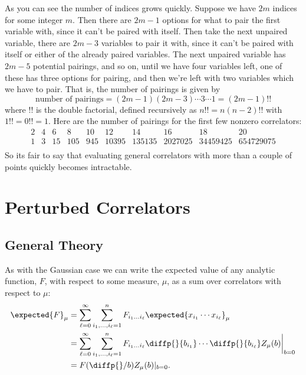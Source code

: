 \documentclass[fleqn]{NotesClass}
\begin{document}
    As you can see the number of indices grows quickly.
    Suppose we have \(2m\) indices for some integer \(m\).
    Then there are \(2m - 1\) options for what to pair the first variable with, since it can't be paired with itself.
    Then take the next unpaired variable, there are \(2m - 3\) variables to pair it with, since it can't be paired with itself or either of the already paired variables.
    The next unpaired variable has \(2m - 5\) potential pairings, and so on, until we have four variables left, one of these has three options for pairing, and then we're left with two variables which we have to pair.
    That is, the number of pairings is given by
    \begin{equation}
        \text{number of pairings} = (2m - 1)(2m - 3) \dotsm 3 \dotsm 1 = (2m - 1)!!
    \end{equation}
    where \(!!\) is the double factorial, defined recursively as \(n!! = n(n - 2)!!\) with \(1!! = 0!! = 1\).
    Here are the number of pairings for the first few nonzero correlators:
    \begin{equation*}
        \begin{array}{rrrrrrrrrr}
            2 & 4 & 6  & 8   & 10  & 12    & 14     & 16      & 18       & 20\\
            1 & 3 & 15 & 105 & 945 & \num{10395} & \num{135135} & \num{2027025} & \num{34459425} & \num{654729075}\\
        \end{array}
    \end{equation*}
    So its fair to say that evaluating general correlators with more than a couple of points quickly becomes intractable.

    \chapter{Perturbed Correlators}
    \section{General Theory}
    As with the Gaussian case we can write the expected value of any analytic function, \(F\), with respect to some measure, \(\mu\), as a sum over correlators with respect to \(\mu\):
    \begin{align}
        \expected{F}_\mu &= \sum_{\ell = 0}^{\infty} \sum_{i_1, \dotsc, i_\ell = 1}^{n} F_{i_1\dotso i_{\ell}} \expected{x_{i_1} \dotsm x_{i_\ell}}_\mu\\
        &= \sum_{\ell = 0}^{\infty} \sum_{i_1, \dotsc, i_{\ell} = 1}^{n} F_{i_1\dotso i_\ell} \diffp{}{b_{i_1}} \dotsm \diffp{}{b_{i_\ell}} Z_\mu(b) \bigg|_{b = 0}\\
        &= F(\diffp{}/{b}) Z_\mu(b)|_{b = 0}.
    \end{align}
    
\end{document}
